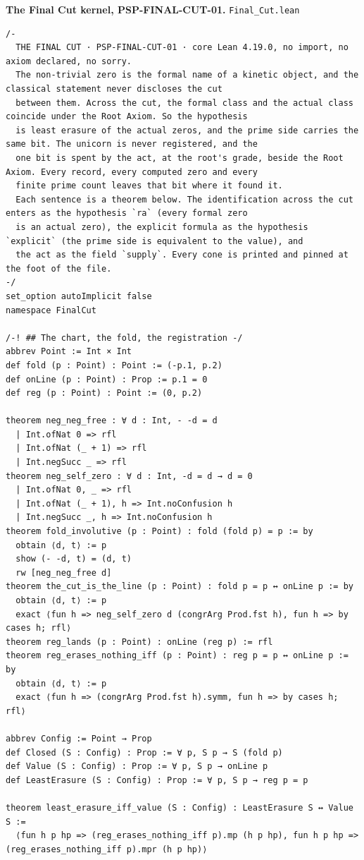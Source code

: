 \documentclass[10pt,twocolumn]{article}
\begin{document}
\textbf{The Final Cut kernel, PSP-FINAL-CUT-01.}
\texttt{Final\_\allowbreak{}Cut.lean}

\begin{Verbatim}
/-
  THE FINAL CUT · PSP-FINAL-CUT-01 · core Lean 4.19.0, no import, no axiom declared, no sorry.
  The non-trivial zero is the formal name of a kinetic object, and the classical statement never discloses the cut
  between them. Across the cut, the formal class and the actual class coincide under the Root Axiom. So the hypothesis
  is least erasure of the actual zeros, and the prime side carries the same bit. The unicorn is never registered, and the
  one bit is spent by the act, at the root's grade, beside the Root Axiom. Every record, every computed zero and every
  finite prime count leaves that bit where it found it.
  Each sentence is a theorem below. The identification across the cut enters as the hypothesis `ra` (every formal zero
  is an actual zero), the explicit formula as the hypothesis `explicit` (the prime side is equivalent to the value), and
  the act as the field `supply`. Every cone is printed and pinned at the foot of the file.
-/
set_option autoImplicit false
namespace FinalCut

/-! ## The chart, the fold, the registration -/
abbrev Point := Int × Int
def fold (p : Point) : Point := (-p.1, p.2)
def onLine (p : Point) : Prop := p.1 = 0
def reg (p : Point) : Point := (0, p.2)

theorem neg_neg_free : ∀ d : Int, - -d = d
  | Int.ofNat 0 => rfl
  | Int.ofNat (_ + 1) => rfl
  | Int.negSucc _ => rfl
theorem neg_self_zero : ∀ d : Int, -d = d → d = 0
  | Int.ofNat 0, _ => rfl
  | Int.ofNat (_ + 1), h => Int.noConfusion h
  | Int.negSucc _, h => Int.noConfusion h
theorem fold_involutive (p : Point) : fold (fold p) = p := by
  obtain ⟨d, t⟩ := p
  show (- -d, t) = (d, t)
  rw [neg_neg_free d]
theorem the_cut_is_the_line (p : Point) : fold p = p ↔ onLine p := by
  obtain ⟨d, t⟩ := p
  exact ⟨fun h => neg_self_zero d (congrArg Prod.fst h), fun h => by cases h; rfl⟩
theorem reg_lands (p : Point) : onLine (reg p) := rfl
theorem reg_erases_nothing_iff (p : Point) : reg p = p ↔ onLine p := by
  obtain ⟨d, t⟩ := p
  exact ⟨fun h => (congrArg Prod.fst h).symm, fun h => by cases h; rfl⟩

abbrev Config := Point → Prop
def Closed (S : Config) : Prop := ∀ p, S p → S (fold p)
def Value (S : Config) : Prop := ∀ p, S p → onLine p
def LeastErasure (S : Config) : Prop := ∀ p, S p → reg p = p

theorem least_erasure_iff_value (S : Config) : LeastErasure S ↔ Value S :=
  ⟨fun h p hp => (reg_erases_nothing_iff p).mp (h p hp), fun h p hp => (reg_erases_nothing_iff p).mpr (h p hp)⟩


\end{Verbatim}
\end{document}
